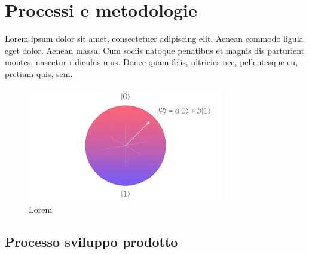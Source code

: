 \chapter{Processi e metodologie}
\label{cap:processi-metodologie}

Lorem ipsum dolor sit amet, consectetuer adipiscing elit. Aenean commodo ligula eget dolor. Aenean massa. Cum sociis natoque penatibus et magnis dis parturient montes, nascetur ridiculus mus. Donec quam felis, ultricies nec, pellentesque eu, pretium quis, sem.

\cite{article:spooky}

\begin{figure}[h]
    \centering
    \includegraphics[height=5cm]{img/qubit.jpeg}
    \caption{Lorem}
    \label{fig:qubit}
\end{figure}

\lipsum[1]

\section{Processo sviluppo prodotto}
